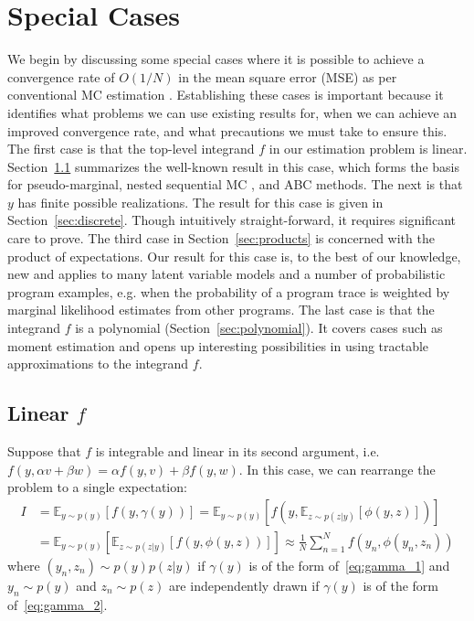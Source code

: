 
\section{Special Cases}
\label{sec:special_cases}

We begin by discussing some special cases where it is possible to achieve a
convergence rate of $O(1/N)$ in the mean square error (MSE) as per conventional
MC estimation \citep{robert2004monte}.  
Establishing these cases is important because it identifies what problems we can use existing results for,
when we can achieve an improved convergence rate, and what precautions we must take to ensure this.
The first case is that the top-level integrand $f$ in our estimation problem is linear. 
Section~\ref{sec:linear_case} summarizes the well-known result in this case, which forms the basis for pseudo-marginal, 
nested sequential MC \citep{andersson2015nested}, and ABC methods. The next is that $y$ has finite possible realizations.
The result for this case is given in Section~\ref{sec:discrete}. Though intuitively straight-forward, it 
requires significant care to prove. The third case in Section~\ref{sec:products} is concerned with the product of expectations.
Our result for this case is, to the best of our knowledge, new and applies to many latent variable models and a number 
of probabilistic program examples, e.g. when the probability of a program trace
is weighted by marginal likelihood estimates from other programs.
The last case is that the integrand $f$ is a polynomial (Section~\ref{sec:polynomial}). It 
covers cases such as moment estimation and opens up interesting possibilities in using tractable 
approximations to the integrand $f$.

\subsection{Linear $f$}
\label{sec:linear_case}

Suppose that $f$ 
is integrable and linear in its second argument, i.e. $f(y,\alpha v + \beta w) = 
\alpha f(y,v)+ \beta f(y,w)$.
In this case, we can rearrange the problem to a single expectation:
\begin{align*}
I
& = \mathbb{E}_{y \sim p(y)}\left[f(y,\gamma(y))\right] = \mathbb{E}_{y \sim p(y)}\left[f\left(y,\mathbb{E}_{z\sim p(z|y)}\left[\phi(y,z)\right]\right)\right]
\\
& = \mathbb{E}_{y \sim p(y)}\left[ \mathbb{E}_{z\sim p(z|y)}\left[f(y,\phi(y,z))\right]\right]
 \approx\frac{1}{N} \sum_{n=1}^{N} f(y_n,\phi(y_n,z_n))
\end{align*}
where $(y_n, z_n) \sim p(y)p(z|y)$ if $\gamma(y)$ is of the form of~\eqref{eq:gamma_1} and
$y_n \sim p(y)$ and $z_n \sim p(z)$ are independently drawn if $\gamma(y)$ is of the form of~\eqref{eq:gamma_2}.

